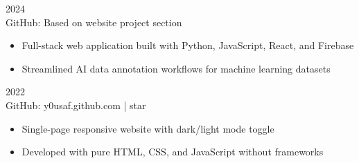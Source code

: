 \documentclass[letterpaper,10pt]{article}
\begin{document}
\hspace{0.15in}{\bfseries AI Data Annotation Platform} \hfill {\small 2024} \\
\hspace{0.15in}GitHub: Based on website project section
\vspace{-1pt}
\begin{itemize}[leftmargin=0.35in, itemsep=-1pt, topsep=1pt, labelsep=0.035in]
\item Full-stack web application built with Python, JavaScript, React, and Firebase
\item Streamlined AI data annotation workflows for machine learning datasets
\end{itemize}
\vspace{1pt}

\hspace{0.15in}{\bfseries Personal Website} \hfill {\small 2022} \\
\hspace{0.15in}GitHub: y0usaf.github.com \enspace |  star
\vspace{-1pt}
\begin{itemize}[leftmargin=0.35in, itemsep=-1pt, topsep=1pt, labelsep=0.035in]
\item Single-page responsive website with dark/light mode toggle
\item Developed with pure HTML, CSS, and JavaScript without frameworks
\end{itemize}
\vspace{1pt}
\end{document}

